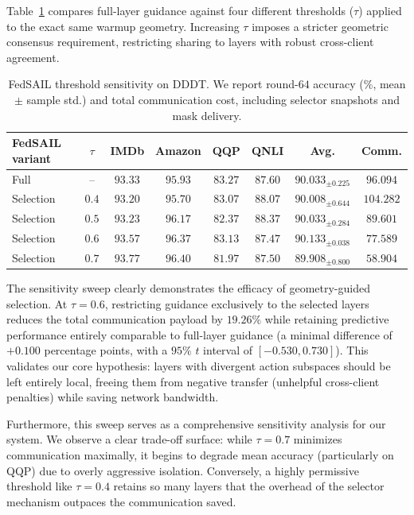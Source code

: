 \documentclass[11pt,letterpaper]{article}
\begin{document}
Table~\ref{tab:dddt-layer-selection} compares full-layer guidance against four different thresholds ($\tau$) applied to the exact same warmup geometry. Increasing $\tau$ imposes a stricter geometric consensus requirement, restricting sharing to layers with robust cross-client agreement.
\begin{table}[!htbp]
    \centering
    \caption{FedSAIL threshold sensitivity on DDDT. We report round-$64$ accuracy (\%, mean $\pm$ sample std.) and total communication cost, including selector snapshots and mask delivery.}
    \label{tab:dddt-layer-selection}
    \small
    \setlength{\tabcolsep}{3pt}
    \begin{tabular*}{\linewidth}{@{\extracolsep{\fill}}lccccccc@{}}
        \toprule
        FedSAIL variant & $\tau$ & IMDb & Amazon & QQP & QNLI & Avg. & Comm. \\
        \midrule
        Full & -- & $93.33$ & $95.93$ & $\mathbf{83.27}$ & $87.60$ & $90.033_{\pm0.225}$ & $96.094$ \\
        \midrule
        Selection & $0.4$ & $93.20$ & $95.70$ & $83.07$ & $88.07$ & $90.008_{\pm0.644}$ & $104.282$ \\
        Selection & $0.5$ & $93.23$ & $96.17$ & $82.37$ & $\mathbf{88.37}$ & $90.033_{\pm0.284}$ & $89.601$ \\
        Selection & $0.6$ & $93.57$ & $96.37$ & $83.13$ & $87.47$ & $\mathbf{90.133}_{\pm0.038}$ & $77.589$ \\
        Selection & $0.7$ & $\mathbf{93.77}$ & $\mathbf{96.40}$ & $81.97$ & $87.50$ & $89.908_{\pm0.800}$ & $\mathbf{58.904}$ \\
        \bottomrule
    \end{tabular*}
\end{table}

The sensitivity sweep clearly demonstrates the efficacy of geometry-guided selection. At $\tau=0.6$, restricting guidance exclusively to the selected layers reduces the total communication payload by $19.26\%$ while retaining predictive performance entirely comparable to full-layer guidance (a minimal difference of $+0.100$ percentage points, with a $95\%$ $t$ interval of $[-0.530,0.730]$). This validates our core hypothesis: layers with divergent action subspaces should be left entirely local, freeing them from negative transfer (unhelpful cross-client penalties) while saving network bandwidth.

Furthermore, this sweep serves as a comprehensive sensitivity analysis for our system. We observe a clear trade-off surface: while $\tau=0.7$ minimizes communication maximally, it begins to degrade mean accuracy (particularly on QQP) due to overly aggressive isolation. Conversely, a highly permissive threshold like $\tau=0.4$ retains so many layers that the overhead of the selector mechanism outpaces the communication saved. 
\end{document}
